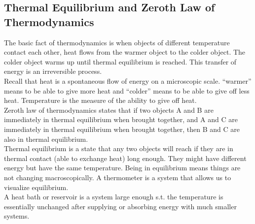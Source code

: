 \documentclass[12pt, a4paper]{article}
\begin{document}
\subsection{Thermal Equilibrium and Zeroth Law of Thermodynamics}

The basic fact of thermodynamics is when objects of different temperature contact each other, heat flows from the warmer object to the colder object. The colder object warms up until thermal equilibrium is reached. This transfer of energy is an irreversible process. \\

Recall that heat is a spontaneous flow of energy on a microscopic scale. ``warmer'' means to be able to give more heat and ``colder'' means to be able to give off less heat. Temperature is the measure of the ability to give off heat. \\

Zeroth law of thermodynamics states that if two objects A and B are immediately in thermal equilibrium when brought together, and A and C are immediately in thermal equilibrium when brought together, then B and C are also in thermal equilibrium. \\

Thermal equilibrium is a state that any two objects will reach if they are in thermal contact (able to exchange heat) long enough. They might have different energy but have the same temperature. Being in equilibrium means things are not changing macroscopically. A thermometer is a system that allows us to visualize equilibrium. \\

A heat bath or reservoir is a system large enough s.t. the temperature is essentially unchanged after supplying or absorbing energy with much smaller systems. \\
\end{document}
